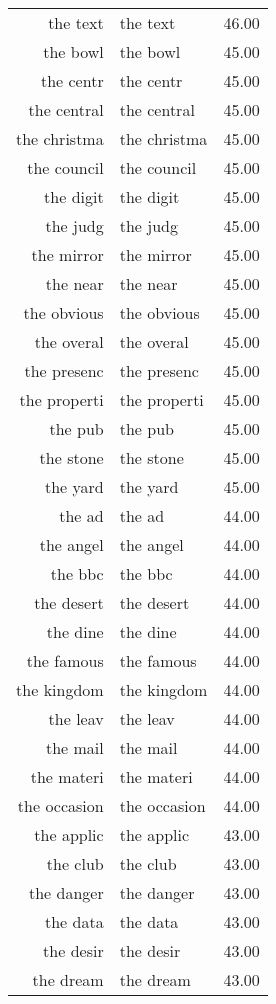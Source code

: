 \begin{table}[ht]
\begin{tabular}{rlr}
  the text & the text & 46.00 \\ 
  the bowl & the bowl & 45.00 \\ 
  the centr & the centr & 45.00 \\ 
  the central & the central & 45.00 \\ 
  the christma & the christma & 45.00 \\ 
  the council & the council & 45.00 \\ 
  the digit & the digit & 45.00 \\ 
  the judg & the judg & 45.00 \\ 
  the mirror & the mirror & 45.00 \\ 
  the near & the near & 45.00 \\ 
  the obvious & the obvious & 45.00 \\ 
  the overal & the overal & 45.00 \\ 
  the presenc & the presenc & 45.00 \\ 
  the properti & the properti & 45.00 \\ 
  the pub & the pub & 45.00 \\ 
  the stone & the stone & 45.00 \\ 
  the yard & the yard & 45.00 \\ 
  the ad & the ad & 44.00 \\ 
  the angel & the angel & 44.00 \\ 
  the bbc & the bbc & 44.00 \\ 
  the desert & the desert & 44.00 \\ 
  the dine & the dine & 44.00 \\ 
  the famous & the famous & 44.00 \\ 
  the kingdom & the kingdom & 44.00 \\ 
  the leav & the leav & 44.00 \\ 
  the mail & the mail & 44.00 \\ 
  the materi & the materi & 44.00 \\ 
  the occasion & the occasion & 44.00 \\ 
  the applic & the applic & 43.00 \\ 
  the club & the club & 43.00 \\ 
  the danger & the danger & 43.00 \\ 
  the data & the data & 43.00 \\ 
  the desir & the desir & 43.00 \\ 
  the dream & the dream & 43.00 \\ 

\end{tabular}
\end{table}
